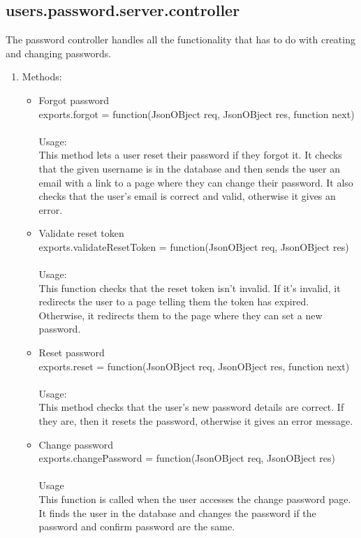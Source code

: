 \documentclass[a4paper,12pt]{report}
\begin{document}
\subsection{users.password.server.controller}
 The password controller handles all the functionality that has to do with creating and changing passwords.
\begin{enumerate}
\item Methods:
	\begin{itemize}
	\item Forgot password\\ exports.forgot = function(JsonOBject req, JsonOBject res, function next)\\ \\
  	Usage: \\
  	This method lets a user reset their password if they forgot it. It checks that the given username is in the database and then sends the user an email with a link to a page where they can change their password. It also checks that the user's email is correct and valid, otherwise it gives an error.
	\item Validate reset token\\ exports.validateResetToken = function(JsonOBject req, JsonOBject res) \\ \\
	Usage: \\
	This function checks that the reset token isn't invalid. If it's invalid, it redirects the user to a page telling them the token has expired. Otherwise, it redirects them to the page where they can set a new password.
	\item Reset password\\ exports.reset = function(JsonOBject req, JsonOBject res, function next)\\  \\
	Usage: \\
	This method checks that the user's new password details are correct. If they are, then it resets the password, otherwise it gives an error message.
 	 \item Change password\\ exports.changePassword = function(JsonOBject req, JsonOBject res)\\ \\
 	 Usage\\ 
  	This function is called when the user accesses the change password page. It finds the user in the database and changes the password if the password and confirm password are the same.
	\end{itemize}
\end{enumerate} 
\end{document}

